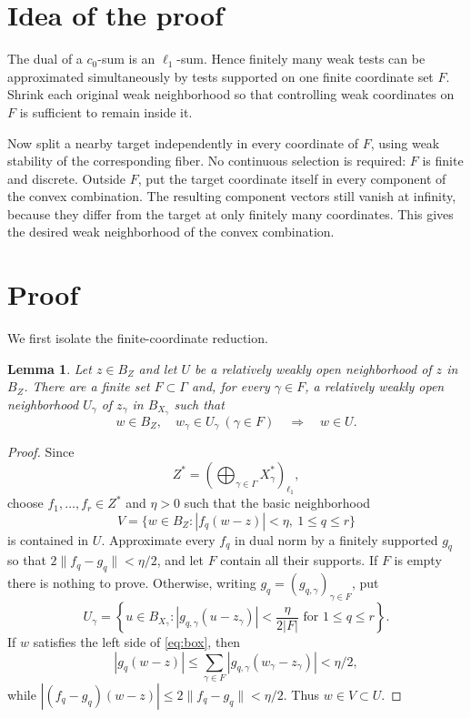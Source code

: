 \documentclass[11pt]{article}
\newtheorem{lemma}{Lemma}
\newcommand{\G}{\Gamma}
\begin{document}
\section{Idea of the proof}

The dual of a $c_0$-sum is an $\ell_1$-sum.  Hence finitely many weak tests can
be approximated simultaneously by tests supported on one finite coordinate
set $F$.  Shrink each original weak neighborhood so that controlling weak
coordinates on $F$ is sufficient to remain inside it.

Now split a nearby target independently in every coordinate of $F$, using weak
stability of the corresponding fiber.  No continuous selection is required:
$F$ is finite and discrete.  Outside $F$, put the target coordinate itself in
every component of the convex combination.  The resulting component vectors
still vanish at infinity, because they differ from the target at only finitely
many coordinates.  This gives the desired weak neighborhood of the convex
combination.

\section{Proof}

We first isolate the finite-coordinate reduction.

\begin{lemma}\label{lem:finite}
Let $z\in B_Z$ and let $U$ be a relatively weakly open neighborhood of $z$ in
$B_Z$.  There are a finite set $F\subset\G$ and, for every $\gamma\in F$, a
relatively weakly open neighborhood $U_\gamma$ of $z_\gamma$ in
$B_{X_\gamma}$ such that
\begin{equation}\label{eq:box}
 w\in B_Z,\quad w_\gamma\in U_\gamma\ (\gamma\in F)
 \quad\Longrightarrow\quad w\in U.
\end{equation}
\end{lemma}

\begin{proof}
Since
\[
 Z^*=\left(\bigoplus_{\gamma\in\G}X_\gamma^*\right)_{\ell_1},
\]
choose $f_1,\dots,f_r\in Z^*$ and $\eta>0$ such that the basic neighborhood
\[
 V=\{w\in B_Z:|f_q(w-z)|<\eta,\ 1\leq q\leq r\}
\]
is contained in $U$.  Approximate every $f_q$ in dual norm by a finitely
supported $g_q$ so that $2\|f_q-g_q\|<\eta/2$, and let $F$ contain all their
supports.  If $F$ is empty there is nothing to prove.  Otherwise, writing
$g_q=(g_{q,\gamma})_{\gamma\in F}$, put
\[
 U_\gamma=\left\{u\in B_{X_\gamma}:
 |g_{q,\gamma}(u-z_\gamma)|<\frac{\eta}{2|F|}
 \text{ for }1\leq q\leq r\right\}.
\]
If $w$ satisfies the left side of \eqref{eq:box}, then
\[
 |g_q(w-z)|\leq\sum_{\gamma\in F}
 |g_{q,\gamma}(w_\gamma-z_\gamma)|<\eta/2,
\]
while $|(f_q-g_q)(w-z)|\leq2\|f_q-g_q\|<\eta/2$.
Thus $w\in V\subset U$.
\end{proof}
\end{document}
